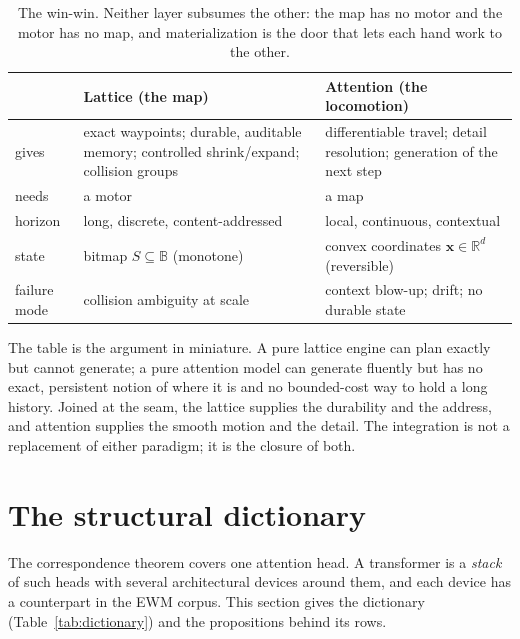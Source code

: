 \documentclass[11pt,a4paper]{article}
\theoremstyle{remark}
\newcommand{\Plane}{\ensuremath{\mathbb{B}}}          %
\newcommand{\xx}{\ensuremath{\mathbf{x}}}               %
\begin{document}
\begin{table}[t]
\centering
\small
\renewcommand{\arraystretch}{1.15}
\begin{tabular}{@{}p{}p{}p{}@{}}
\toprule
 & \textbf{Lattice (the map)} & \textbf{Attention (the locomotion)} \\
\midrule
gives & exact waypoints; durable, auditable memory; controlled shrink/expand; collision groups & differentiable travel; detail resolution; generation of the next step \\
needs & a motor & a map \\
horizon & long, discrete, content-addressed & local, continuous, contextual \\
state & bitmap $S\subseteq\Plane$ (monotone) & convex coordinates $\xx\in\mathbb{R}^{d}$ (reversible) \\
failure mode & collision ambiguity at scale & context blow-up; drift; no durable state \\
\bottomrule
\end{tabular}
\caption{The win-win. Neither layer subsumes the other: the map has no motor
and the motor has no map, and materialization is the door that lets each hand
work to the other.}
\label{tab:winwin}
\end{table}

The table is the argument in miniature. A pure lattice engine can plan exactly
but cannot generate; a pure attention model can generate fluently but has no
exact, persistent notion of where it is and no bounded-cost way to hold a long
history. Joined at the seam, the lattice supplies the durability and the
address, and attention supplies the smooth motion and the detail. The
integration is not a replacement of either paradigm; it is the closure of both.

\section{The structural dictionary}
\label{sec:dictionary}

The correspondence theorem covers one attention head. A transformer is a
\emph{stack} of such heads with several architectural devices around them, and
each device has a counterpart in the EWM corpus. This section gives the
dictionary (Table~\ref{tab:dictionary}) and the propositions behind its rows.
\end{document}
